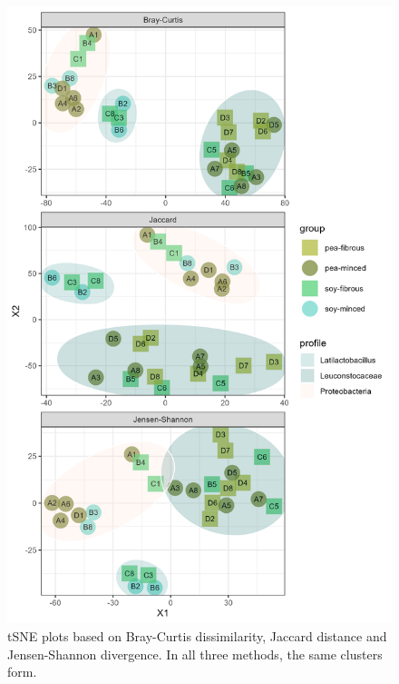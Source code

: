 \documentclass[preprint,3p,
a4paper]{elsarticle} %
\begin{document}
\begin{figure}

{\centering \includegraphics[width=0.8\linewidth]{FigSM4} 

}

\caption{\label{figSM3} tSNE plots based on Bray-Curtis dissimilarity, Jaccard distance and Jensen-Shannon divergence. In all three methods, the same clusters form.  }\label{fig:figSM3}
\end{figure}
\end{document}
